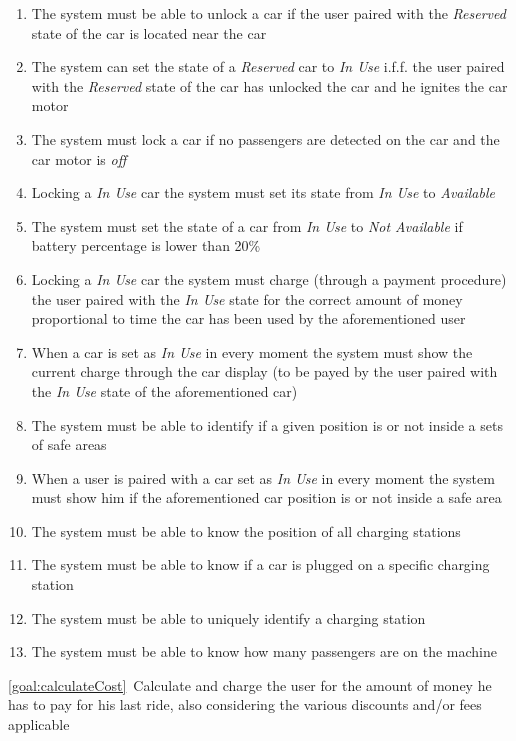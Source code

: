 \begin{description}
\begin{enumerate}[resume*]
  				\item The system must be able to unlock a car if the user paired with the
  				\emph{Reserved} state of the car is located near  the car
  				\item The system can set the state of a \emph{Reserved} car to \emph{In Use} i.f.f.
  				the user paired with the \emph{Reserved} state of the car has unlocked the car and he
  				ignites the car motor
  				\item The system must lock a car if no passengers are detected on the car and the car
  				motor is \emph{off}
  				\item Locking a \emph{In Use} car the system must set its state from \emph{In Use}
  				to \emph{Available}
  				\item The system must set the state of a car from \emph{In Use}
  				to \emph{Not Available} if battery percentage is lower than 20\%
  				\item Locking a \emph{In Use} car the system must charge (through a payment
  				procedure) the user paired with the \emph{In Use} state for the correct amount of
  				money proportional to time the car has been used by the aforementioned user
  				\item When a car is set as \emph{In Use} in every moment the
  				system must show the current charge through the car display (to be payed by the user
  				paired with the \emph{In Use} state of the aforementioned car) 
  				\item The system must be able to identify if a given position is or not inside a sets of
  				safe areas
  				\item When a user is paired with a car set as \emph{In Use} in every moment the
  				system must show him if the aforementioned car position is or not inside a safe area
  				\item The system must be able to know the position of all charging stations
  				\item The system must be able to know if a car is plugged on a specific charging
  				station
  				\item The system must be able to uniquely identify a charging station
  				\item The system must be able to know how many passengers are on the machine	
   			\end{enumerate}
  		\item \ref{goal:calculateCost}\ Calculate and charge the user for the amount of money he
  		has to pay for his last ride, also considering the various discounts and/or fees applicable

\end{description}
